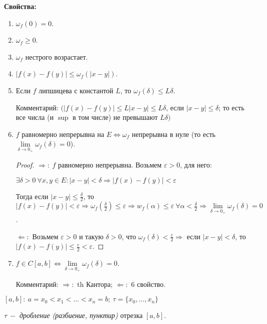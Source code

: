 \begin{statement} \textbf{Свойства:}
    \begin{enumerate}
        \item $\omega_f(0)=0$.
        \item $\omega_f\geq 0$.
        \item $\omega_f$ нестрого возрастает.
        \item $|f(x)-f(y)|\leq \omega_f(|x-y|)$.
        \item Если $f$ липшицева с константой $L$, то $\omega_f(\delta)\leq L\delta$.

        Комментарий: $(|f(x)-f(y)|\leq L|x-y|\leq L\delta$, если $|x-y|\leq \delta$; то есть все числа (и $\sup$ в том числе) не превышают $L\delta)$
        \item $f$ равномерно непрерывна на $E\Leftrightarrow \omega_f$ непрерывна в нуле (то есть $\lim\limits_{\delta\rightarrow0_+}\omega_f(\delta)=0$).
        \begin{proof}
            $\Rightarrow:\ f$ равномерно непрерывна. Возьмем $\varepsilon>0$, для него:
            
            $\exists \delta >0\ \forall x, y\in E: |x-y|<\delta\Rightarrow |f(x)-f(y)|<\varepsilon$ 
            
            Тогда если $|x-y|\leq\frac{\delta}{2}$, то $|f(x)-f(y)|<\varepsilon\Rightarrow\omega_f(\frac{\delta}{2})\leq \varepsilon\Rightarrow w_f(\alpha)\leq\varepsilon\ \forall \alpha <\frac{\delta}{2}\Rightarrow \lim\limits_{\delta\rightarrow0_+}\omega_f(\delta)=0$.

            $\Leftarrow:$ Возьмем $\varepsilon>0$ и такую $\delta>0$, что $\omega_f(\delta)<\frac{\varepsilon}{2}\Rightarrow $ если $|x-y|<\delta$, то $|f(x)-f(y)|\leq \frac{\varepsilon}{2}<\varepsilon$.
        \end{proof}
        \item $f\in C[a, b]\Leftrightarrow \lim\limits_{\delta\rightarrow0_+}\omega_f(\delta)=0$.

        Комментарий: $\Rightarrow:$ th Кантора; $\Leftarrow:$ 6 свойство.
    \end{enumerate}
\end{statement}

\begin{definition}
    $[a, b]:\ a=x_0<x_1<...<x_n=b;\ \tau=\{x_0, ..., x_n\}$

    $\tau\ -$ \textit{дробление (разбиение, пунктир)} отрезка $[a, b]$. 
\end{definition}

